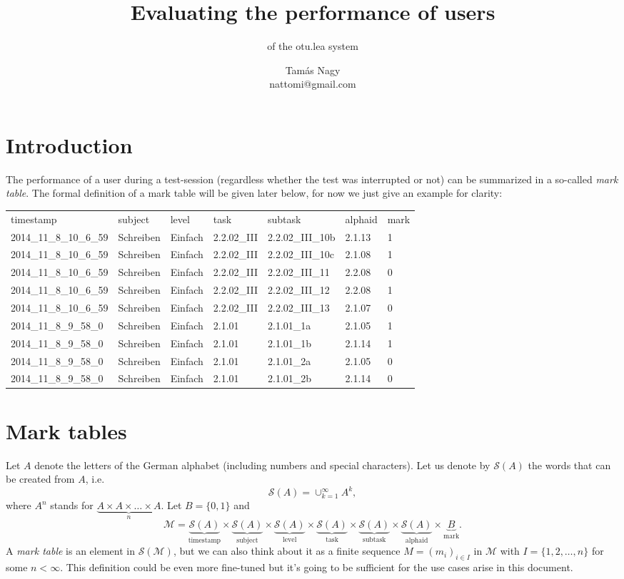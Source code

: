 \documentclass{scrartcl}
\title{Evaluating the performance of users}
\subtitle{of the otu.lea system}
\author{Tamás Nagy\\ \small nattomi@gmail.com}
\begin{document}
\maketitle
\section{Introduction}
The performance of a user during a test-session (regardless whether the test was interrupted or not) can be summarized in a so-called \emph{mark table}. The formal definition of a mark table will be given later below, for now we just give an example for clarity:

\vspace{.5cm}
\begin{tabular}{lllllll}
timestamp	& subject	& level	& task	& subtask	& alphaid	& mark\\
2014\_11\_8\_10\_6\_59	& Schreiben	& Einfach	& 2.2.02\_III	& 2.2.02\_III\_10b	& 2.1.13	& 1\\
2014\_11\_8\_10\_6\_59	& Schreiben	& Einfach	& 2.2.02\_III	& 2.2.02\_III\_10c	& 2.1.08	& 1\\
2014\_11\_8\_10\_6\_59	& Schreiben	& Einfach	& 2.2.02\_III	& 2.2.02\_III\_11	& 2.2.08	& 0\\
2014\_11\_8\_10\_6\_59	& Schreiben	& Einfach	& 2.2.02\_III	& 2.2.02\_III\_12	& 2.2.08	& 1\\
2014\_11\_8\_10\_6\_59	& Schreiben	& Einfach	& 2.2.02\_III	& 2.2.02\_III\_13	& 2.1.07	& 0\\
2014\_11\_8\_9\_58\_0	& Schreiben	& Einfach	& 2.1.01	& 2.1.01\_1a	& 2.1.05	& 1\\
2014\_11\_8\_9\_58\_0	& Schreiben	& Einfach	& 2.1.01	& 2.1.01\_1b	& 2.1.14	& 1\\
2014\_11\_8\_9\_58\_0	& Schreiben	& Einfach	& 2.1.01	& 2.1.01\_2a	& 2.1.05	& 0\\
2014\_11\_8\_9\_58\_0	& Schreiben	& Einfach	& 2.1.01	& 2.1.01\_2b	& 2.1.14	& 0\\
\end{tabular}

\section{Mark tables}
Let $A$ denote the letters of the German alphabet (including numbers and special characters). Let us denote by $\mathcal{S}(A)$ the words that can be created from $A$, i.e.
$$\mathcal{S}(A)=\cup_{k=1}^{\infty}A^k,$$
where $A^n$ stands for $\underbrace{A\times A\times\ldots \times A}_{n}$. Let $B=\{0,1\}$ and $$\mathcal{M}=\underbrace{\mathcal{S}(A)}_{\mbox{timestamp}}\times\underbrace{\mathcal{S}(A)}_{\mbox{subject}}\times\underbrace{\mathcal{S}(A)}_{\mbox{level}}\times\underbrace{\mathcal{S}(A)}_{\mbox{task}}\times\underbrace{\mathcal{S}(A)}_{\mbox{subtask}}\times\underbrace{\mathcal{S}(A)}_{\mbox{alphaid}}\times \underbrace{B}_{\mbox{mark}}.$$ A \emph{mark table} is an element in $\mathcal{S}(\mathcal{M})$, but we can also think about it as a finite sequence $M=(m_i)_{i\in I}$ in $\mathcal{M}$ with $I=\{1,2,\ldots,n\}$ for some $n<\infty$. This definition could be even more fine-tuned but it's going to be sufficient for the use cases arise in this document.
\end{document}
